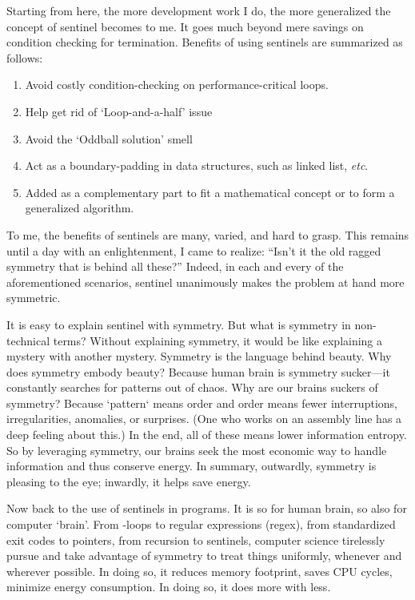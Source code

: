 Starting from here, the more development work I do, the more generalized the
concept of sentinel becomes to me.
It goes much beyond mere savings on condition checking for termination.
Benefits of using sentinels are summarized as follows:
\begin{enumerate}
    \item\label{itm:sentinel:performance} Avoid costly condition-checking on performance-critical
    loops.
    \item\label{itm:sentinel:loop-and-a-half} Help get rid of `Loop-and-a-half' issue
    \item\label{itm:sentinel:oddball} Avoid the `Oddball solution' smell~\cite{Fowler1999}
    \item\label{itm:sentinel:ds} Act as a boundary-padding in data structures,
    such as linked list, \textit{etc}.
    \item Added as a complementary part to fit a mathematical concept
    or to form a generalized algorithm.
\end{enumerate}


To me, the benefits of sentinels are many, varied, and hard to grasp.
This remains until a day with an enlightenment, I came to realize: ``Isn't it the old ragged
symmetry that is behind all these?''
Indeed, in each and every of the aforementioned scenarios,
sentinel unanimously makes the problem at hand more symmetric.


It is easy to explain sentinel with symmetry.
But what is symmetry in non-technical terms?
Without explaining symmetry, it would be like explaining a mystery with another mystery.
Symmetry is the language behind beauty.
Why does symmetry embody beauty?
Because human brain is symmetry sucker---it constantly searches for patterns out of chaos.
Why are our brains suckers of symmetry?
Because `pattern` means order and order means fewer interruptions, irregularities, anomalies, or
surprises.
(One who works on an assembly line has a deep feeling about this.)
In the end, all of these means lower information entropy.
So by leveraging symmetry, our brains seek the most economic way to handle information and thus
conserve energy.
In summary, outwardly, symmetry is pleasing to the eye;
inwardly, it helps save energy.


Now back to the use of sentinels in programs.
It is so for human brain, so also for computer `brain'.
From -loops to regular expressions (regex), from standardized exit codes
to  pointers, from recursion to sentinels, computer science tirelessly
pursue and take advantage of symmetry to treat things uniformly, whenever and wherever possible.
In doing so, it reduces memory footprint, saves CPU cycles, minimize energy consumption.
In doing so, it does more with less.


